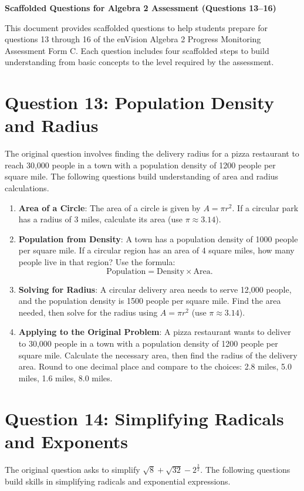 \documentclass[12pt]{article}
\begin{document}
\begin{center}
    \textbf{Scaffolded Questions for Algebra 2 Assessment (Questions 13--16)}
\end{center}

This document provides scaffolded questions to help students prepare for questions 13 through 16 of the enVision Algebra 2 Progress Monitoring Assessment Form C. Each question includes four scaffolded steps to build understanding from basic concepts to the level required by the assessment.

\section*{Question 13: Population Density and Radius}
The original question involves finding the delivery radius for a pizza restaurant to reach 30,000 people in a town with a population density of 1200 people per square mile. The following questions build understanding of area and radius calculations.

\begin{enumerate}[label=13.\arabic*]
    \item \textbf{Area of a Circle}: The area of a circle is given by \( A = \pi r^2 \). If a circular park has a radius of 3 miles, calculate its area (use \( \pi \approx 3.14 \)).
    \item \textbf{Population from Density}: A town has a population density of 1000 people per square mile. If a circular region has an area of 4 square miles, how many people live in that region? Use the formula:
    \[
    \text{Population} = \text{Density} \times \text{Area}.
    \]
    \item \textbf{Solving for Radius}: A circular delivery area needs to serve 12,000 people, and the population density is 1500 people per square mile. Find the area needed, then solve for the radius using \( A = \pi r^2 \) (use \( \pi \approx 3.14 \)).
    \item \textbf{Applying to the Original Problem}: A pizza restaurant wants to deliver to 30,000 people in a town with a population density of 1200 people per square mile. Calculate the necessary area, then find the radius of the delivery area. Round to one decimal place and compare to the choices: 2.8 miles, 5.0 miles, 1.6 miles, 8.0 miles.
\end{enumerate}

\section*{Question 14: Simplifying Radicals and Exponents}
The original question asks to simplify \( \sqrt{8} + \sqrt{32} - 2^{\frac{3}{2}} \). The following questions build skills in simplifying radicals and exponential expressions.
\end{document}
